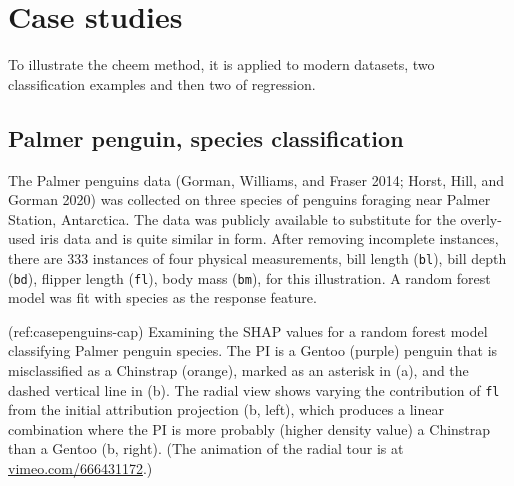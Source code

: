 \documentclass[
]{article}
\begin{document}
\hypertarget{sec:casestudies}{%
\section{Case studies}\label{sec:casestudies}}

To illustrate the cheem method, it is applied to modern datasets, two
classification examples and then two of regression.

\hypertarget{palmer-penguin-species-classification}{%
\subsection{Palmer penguin, species
classification}\label{palmer-penguin-species-classification}}

The Palmer penguins data (Gorman, Williams, and Fraser 2014; Horst,
Hill, and Gorman 2020) was collected on three species of penguins
foraging near Palmer Station, Antarctica. The data was publicly
available to substitute for the overly-used iris data and is quite
similar in form. After removing incomplete instances, there are 333
instances of four physical measurements, bill length (\texttt{bl}), bill
depth (\texttt{bd}), flipper length (\texttt{fl}), body mass
(\texttt{bm}), for this illustration. A random forest model was fit with
species as the response feature.

(ref:casepenguins-cap) Examining the SHAP values for a random forest
model classifying Palmer penguin species. The PI is a Gentoo (purple)
penguin that is misclassified as a Chinstrap (orange), marked as an
asterisk in (a), and the dashed vertical line in (b). The radial view
shows varying the contribution of \texttt{fl} from the initial
attribution projection (b, left), which produces a linear combination
where the PI is more probably (higher density value) a Chinstrap than a
Gentoo (b, right). (The animation of the radial tour is at
\href{https://vimeo.com/666431172}{vimeo.com/666431172}.)
\end{document}
